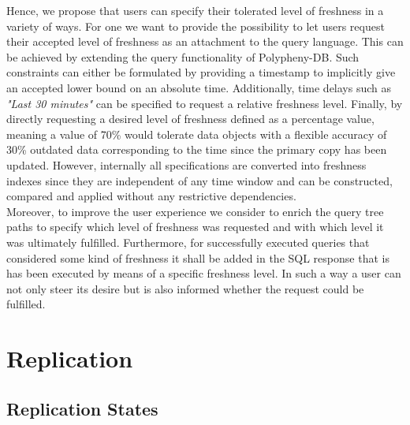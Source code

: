 Hence, we propose that users can specify their tolerated level of freshness in a variety of ways. For one we want to provide the possibility to let users 
request their accepted level of freshness as an attachment to the query language. This can be achieved by extending the query functionality of Polypheny-DB.
Such constraints can either be formulated by providing a timestamp to implicitly give an accepted lower bound on an absolute time.
Additionally, time delays such as \textit{"Last 30 minutes"} can be specified to request a relative freshness level.
Finally, by directly requesting a desired level of freshness defined as a percentage value, meaning a value of 70\% would tolerate data objects
with a flexible accuracy of 30\% outdated data corresponding to the time since the primary copy has been updated.
However, internally all specifications are converted into freshness indexes since they are independent of any time window and can be constructed, compared and applied 
without any restrictive dependencies.\\

Moreover, to improve the user experience we consider to enrich the query tree paths to specify which level of freshness was requested and with which level it was 
ultimately fulfilled. Furthermore, for successfully executed queries that considered some kind of freshness it shall be added in the SQL response that is has been 
executed by means of a specific freshness level.
In such a way a user can not only steer its desire but is also informed whether the request could be fulfilled.




\section{Replication}
\label{sec:replication}

\subsection{Replication States}
\label{sec:state}

